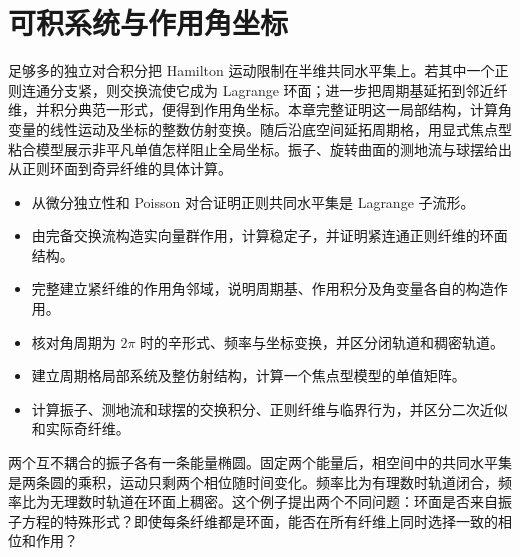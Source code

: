 
% 
% 

\chapter{可积系统与作用角坐标}
\label{g4:ch:11}

\begin{chapterabstract}
足够多的独立对合积分把 Hamilton 运动限制在半维共同水平集上。若其中一个正则连通分支紧，则交换流使它成为 Lagrange 环面；进一步把周期基延拓到邻近纤维，并积分典范一形式，便得到作用角坐标。本章完整证明这一局部结构，计算角变量的线性运动及坐标的整数仿射变换。随后沿底空间延拓周期格，用显式焦点型粘合模型展示非平凡单值怎样阻止全局坐标。振子、旋转曲面的测地流与球摆给出从正则环面到奇异纤维的具体计算。
\end{chapterabstract}

\begin{learninggoals}
\begin{itemize}
	\item 从微分独立性和 Poisson 对合证明正则共同水平集是 Lagrange 子流形。
	\item 由完备交换流构造实向量群作用，计算稳定子，并证明紧连通正则纤维的环面结构。
	\item 完整建立紧纤维的作用角邻域，说明周期基、作用积分及角变量各自的构造作用。
	\item 核对角周期为 \(2\pi\) 时的辛形式、频率与坐标变换，并区分闭轨道和稠密轨道。
	\item 建立周期格局部系统及整仿射结构，计算一个焦点型模型的单值矩阵。
	\item 计算振子、测地流和球摆的交换积分、正则纤维与临界行为，并区分二次近似和实际奇纤维。
\end{itemize}
\end{learninggoals}

两个互不耦合的振子各有一条能量椭圆。固定两个能量后，相空间中的共同水平集是两条圆的乘积，运动只剩两个相位随时间变化。频率比为有理数时轨道闭合，频率比为无理数时轨道在环面上稠密。这个例子提出两个不同问题：环面是否来自振子方程的特殊形式？即使每条纤维都是环面，能否在所有纤维上同时选择一致的相位和作用？

\ProseParagraphBreak

